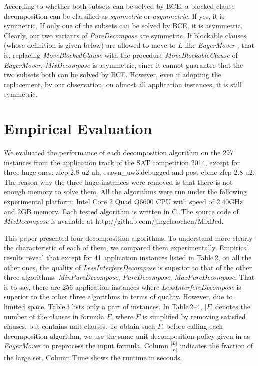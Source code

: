 \documentclass{llncs}
\begin{document}
According to whether both subsets can be solved by BCE, a blocked
clause decomposition can be classified as \emph{symmetric} or
\emph{asymmetric}. If yes, it is symmetric. If only one of the
subsets can be solved by BCE, it is asymmetric. Clearly, our two
variants of \emph{PureDecompose} are symmetric. If blockable clauses
(whose definition is given below) are allowed to move to $L$ like
\emph{EagerMover} \cite{EagerMover:14}, that is, replacing
\emph{MoveBlockedClause} with the procedure
\emph{MoveBlockableClause} of \emph{EagerMover},
 \emph{MixDecompose} is asymmetric,
since it cannot guarantee that the two subsets both can be solved by
BCE. However, even if adopting the replacement, by our observation,
on almost all application instances, it is still symmetric.


\section{Empirical Evaluation}

  We evaluated the performance of each decomposition algorithm on the
297 instances from the application track of the SAT competition
2014, except for three huge ones: zfcp-2.8-u2-nh,
esawn\_uw3.debugged and post-cbmc-zfcp-2.8-u2. The reason why the
three huge instances were removed is that there is not enough memory
to solve them. All the algorithms were run under the following
experimental platform: Intel Core 2 Quad Q6600 CPU with speed of
2.40GHz and 2GB memory. Each tested algorithm is written in C. The
source code of \emph{MixDecompose} is available at
http://github.com/jingchaochen/MixBcd.

  This paper presented four decomposition algorithms. To
understand more clearly the characteristic of each of them, we
compared them experimentally. Empirical results reveal that except
for 41 application instances listed in Table\,2, on all the other
ones, the quality of \emph{LessInterfereDecompose} is superior to
that of the other three algorithms: \emph{MinPureDecompose},
\emph{PureDecompose}, \emph{MaxPureDecompose}. That is to say, there
are 256 application instances where \emph{LessInterfereDecompose} is
superior to the other three algorithms in terms of quality. However,
due to limited space, Table\,3 lists only a part of instances. In
Table\,2--4, $|F|$ denotes the number of the clauses in formula $F$,
where $F$ is simplified by removing satisfied clauses, but contains
unit clauses. To obtain such $F$, before calling each decomposition
algorithm, we use the same unit decomposition policy given in
\cite{EagerMover:14} as \emph{EagerMover} to preprocess the input
formula. Column $\frac{|L|}{|F|}$ indicates the fraction of the
large set. Column Time shows the runtime in seconds.
\end{document}
